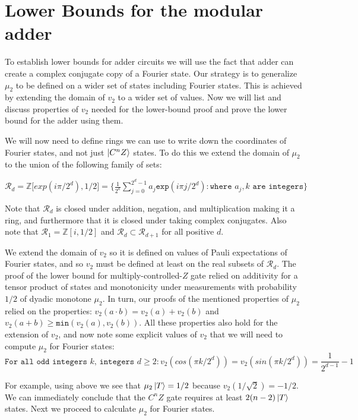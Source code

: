 \documentclass[12pt]{dalthesis}
\begin{document}
\section{Lower Bounds for the modular adder}
To establish lower bounds for adder circuits we will use the fact that adder can create a complex conjugate copy of a Fourier state. Our strategy is to generalize $\mu_2$ to be defined on a wider set of states including Fourier states. This is achieved by extending the domain of $v_2$ to a wider set of values. Now we will list and discuss properties of $v_2$ needed for the lower-bound proof and prove the lower bound for the adder using them. 

We will now need to define rings we can use to write down the coordinates of Fourier states, and not just $\ket{C^nZ}$ states. To do this we extend the domain of $\mu_2$ to the union of the following family of sets:
\begin{center}
$\mathcal{R}_d = \mathbb{Z} \big[ exp(i\pi /2^d), 1/2 \big] = \Big\{ \frac{1}{2^k} \sum\limits_{j=0}^{2^d - 1} a_j \texttt{exp}(i\pi j/2^d): \texttt{where } a_j, k \texttt{ are integers} \Big\}$
\end{center}
Note that $\mathcal{R}_d$ is closed under addition, negation, and multiplication making it a ring, and furthermore that it is closed under taking complex conjugates. Also note that $\mathcal{R}_1 = \mathbb{Z}[i, 1/2]$ and $\mathcal{R}_d \subset \mathcal{R}_{d+1}$ for all positive $d$.

We extend the domain of $v_2$ so it is defined on values of Pauli expectations of Fourier states, and so $v_2$ must be defined at least on the real subsets of $\mathcal{R}_d$. The proof of the lower bound for multiply-controlled-$Z$ gate relied on additivity for a tensor product of states and monotonicity under measurements with probability $1/2$ of dyadic monotone $\mu_2$. In turn, our proofs of the mentioned properties of $\mu_2$ relied on the properties: $v_2(a \cdot b) = v_2(a) + v_2(b)$ and $v_2(a+b) \geq \texttt{min}(v_2(a), v_2(b))$. All these properties also hold for the extension of $v_2$, and now note some explicit values of $v_2$ that we will need to compute $\mu_2$ for Fourier states:
\begin{equation}
\texttt{For all odd integers } k \texttt{, integers } d \geq 2: v_2(cos(\pi k/2^d)) = v_2(sin(\pi k /2^d)) = \frac{1}{2^{d-1}} - 1
\end{equation}

For example, using above we see that $\mu_2\ket{T} = 1/2$ because $v_2(1/\sqrt{2}) = -1/2$. We can immediately conclude that the $C^nZ$ gate requires at least $2(n-2)\ket{T}$ states. Next we proceed to calculate $\mu_2$ for Fourier states.
\end{document}
